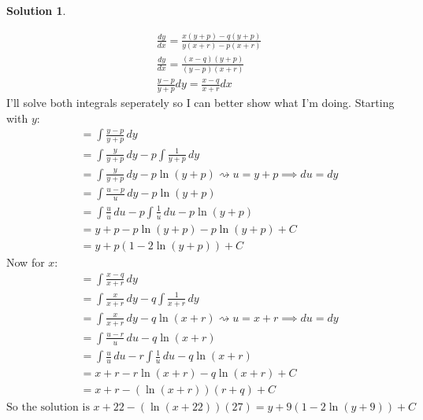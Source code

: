 \documentclass[10pt]{article}
\theoremstyle{definition}
\newtheorem{soln}{Solution}
\begin{document}
\begin{soln}
\begin{enumerate}[label=(\alph*)]
          \begin{align*}
             & \frac{dy}{dx}=\frac{x(y+p)-q(y+p)}{y(x+r)-p(x+r)}   \\
             & \frac{dy}{dx}=\frac{(x-q)(y+p)}{(y-p)(x+r)}         \\
             & \frac{y-p}{y+p}dy=\frac{x-q}{x+r}dx               
          \end{align*}
          I'll solve both integrals seperately so I can better show what I'm doing. Starting with $y$:
          \begin{align*}
             & =\int \frac{y-p}{y+p}\,dy                                               \\
             & =\int \frac{y}{y+p}\,dy-p\int \frac{1}{y+p}\,dy                         \\
             & =\int \frac{y}{y+p}\,dy-p\ln(y+p)\rightsquigarrow u=y+p\implies du=dy   \\
             & =\int \frac{u-p}{u}\,dy-p\ln(y+p)                                       \\
             & =\int \frac{u}{u}\,du-p\int \frac{1}{u}\,du-p\ln(y+p)                   \\
             & =y+p-p\ln(y+p)-p\ln(y+p)+C                                              \\
             & =y+p(1-2\ln(y+p))+C                                                   
          \end{align*}
          Now for $x$:
          \begin{align*}
             & =\int \frac{x-q}{x+r}\,dy                                               \\
             & =\int \frac{x}{x+r}\,dy-q\int \frac{1}{x+r}\,dy                         \\
             & =\int \frac{x}{x+r}\,dy-q\ln(x+r)\rightsquigarrow u=x+r\implies du=dy   \\
             & =\int \frac{u-r}{u}\,du-q\ln(x+r)                                       \\
             & =\int \frac{u}{u}\,du-r\int \frac{1}{u}\,du-q\ln(x+r)                   \\
             & =x+r-r\ln(x+r)-q\ln(x+r)+C                                              \\
             & =x+r-(\ln(x+r))(r+q)+C                                                
          \end{align*}
          $\text{So the solution is } \displaystyle x+22-(\ln(x+22))(27)=y+9(1-2\ln(y+9))+C$
  \end{enumerate}
\end{soln}
\end{document}
